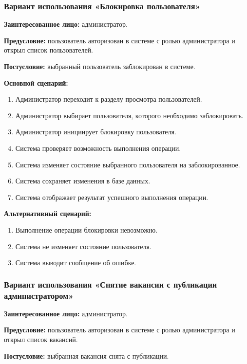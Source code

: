 \subsubsection{Вариант использования «Блокировка пользователя»}

\textbf{Заинтересованное лицо:} администратор.

\textbf{Предусловие:} пользователь авторизован в системе с ролью администратора и открыл список пользователей.

\textbf{Постусловие:} выбранный пользователь заблокирован в системе.

\textbf{Основной сценарий:}
\begin{enumerate}
	\item Администратор переходит к разделу просмотра пользователей.
	\item Администратор выбирает пользователя, которого необходимо заблокировать.
	\item Администратор инициирует блокировку пользователя.
	\item Система проверяет возможность выполнения операции.
	\item Система изменяет состояние выбранного пользователя на заблокированное.
	\item Система сохраняет изменения в базе данных.
	\item Система отображает результат успешного выполнения операции.
\end{enumerate}

\textbf{Альтернативный сценарий:}
\begin{enumerate}
	\item Выполнение операции блокировки невозможно.
	\item Система не изменяет состояние пользователя.
	\item Система выводит сообщение об ошибке.
\end{enumerate}

\subsubsection{Вариант использования «Снятие вакансии с публикации администратором»}

\textbf{Заинтересованное лицо:} администратор.

\textbf{Предусловие:} пользователь авторизован в системе с ролью администратора и открыл список вакансий.

\textbf{Постусловие:} выбранная вакансия снята с публикации.

